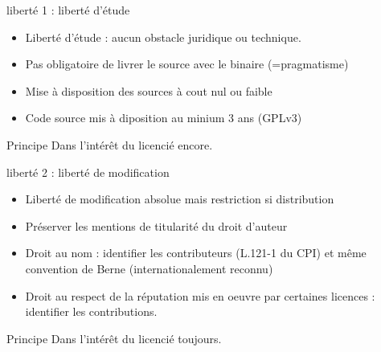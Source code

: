 \documentclass{beamer}
\begin{document}

\begin{frame}{liberté 1 : liberté d'étude}
  \begin{itemize}
  \item Liberté d'étude : aucun obstacle juridique ou technique.
  \item Pas obligatoire de livrer le source avec le binaire (=pragmatisme)
  \item Mise à disposition des sources à cout nul ou faible
  \item Code source mis à diposition au minium 3 ans (GPLv3)
  \end{itemize}
  \begin{alertblock}{Principe}
    Dans l'intérêt du licencié encore.
  \end{alertblock}
\end{frame}


\begin{frame}{liberté 2 : liberté de modification}
  \begin{itemize}
  \item Liberté de modification absolue mais restriction si
    distribution
  \item Préserver les mentions de titularité du droit d'auteur
  \item Droit au nom : identifier les contributeurs (L.121-1 du CPI)
    et même convention de Berne (internationalement reconnu)
  \item Droit au respect de la réputation mis en oeuvre par certaines
    licences : identifier les contributions.
  \end{itemize}
\begin{alertblock}{Principe}
    Dans l'intérêt du licencié toujours.
  \end{alertblock}
\end{frame}
\end{document}
